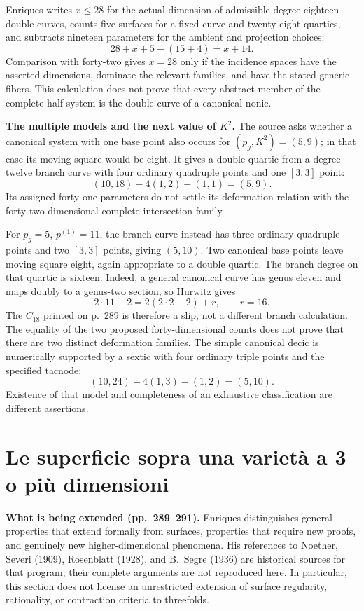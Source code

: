 Enriques writes \(x\leq28\) for the actual dimension of admissible degree-eighteen double curves, counts five surfaces for a fixed curve and twenty-eight quartics, and subtracts nineteen parameters for the ambient and projection choices:
\[
28+x+5-(15+4)=x+14.
\]
Comparison with forty-two gives \(x=28\) only if the incidence spaces have the asserted dimensions, dominate the relevant families, and have the stated generic fibers. This calculation does not prove that every abstract member of the complete half-system is the double curve of a canonical nonic.

\textbf{The multiple models and the next value of \(K^2\).}
The source asks whether a canonical system with one base point also occurs for \((p_g,K^2)=(5,9)\); in that case its moving square would be eight. It gives a double quartic from a degree-twelve branch curve with four ordinary quadruple points and one \([3,3]\) point:
\[
(10,18)-4(1,2)-(1,1)=(5,9).
\]
Its assigned forty-one parameters do not settle its deformation relation with the forty-two-dimensional complete-intersection family.

For \(p_g=5\), \(p^{(1)}=11\), the branch curve instead has three ordinary quadruple points and two \([3,3]\) points, giving \((5,10)\). Two canonical base points leave moving square eight, again appropriate to a double quartic. The branch degree on that quartic is sixteen. Indeed, a general canonical curve has genus eleven and maps doubly to a genus-two section, so Hurwitz gives
\[
2\cdot11-2=2(2\cdot2-2)+r,\qquad r=16.
\]
The \(C_{18}\) printed on p.~289 is therefore a slip, not a different branch calculation. The equality of the two proposed forty-dimensional counts does not prove that there are two distinct deformation families. The simple canonical decic is numerically supported by a sextic with four ordinary triple points and the specified tacnode:
\[
(10,24)-4(1,3)-(1,2)=(5,10).
\]
Existence of that model and completeness of an exhaustive classification are different assertions.

\section{Le superficie sopra una varietà a 3 o più dimensioni}
\label{cp2-viii-9}

\textbf{What is being extended (pp.~289--291).}
Enriques distinguishes general properties that extend formally from surfaces, properties that require new proofs, and genuinely new higher-dimensional phenomena. His references to Noether, Severi (1909), Rosenblatt (1928), and B.~Segre (1936) are historical sources for that program; their complete arguments are not reproduced here. In particular, this section does not license an unrestricted extension of surface regularity, rationality, or contraction criteria to threefolds.

